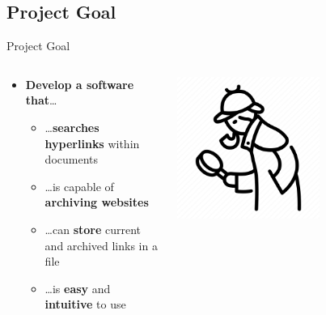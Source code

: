 \documentclass[
    ngerman,%
    authorontitle=true,
]{bfhbeamer}
\begin{document}
    \subsection{Project Goal}
    \begin{frame}{Project Goal}
        \begin{columns} %
            \begin{column}{0.5\textwidth} %
                \begin{itemize}
                    \item \textbf{Develop a software that}\ldots
                    \begin{itemize}
                        \item \ldots \textbf{searches hyperlinks} within documents
                        \item \ldots is capable of \textbf{archiving websites}
                        \item \ldots can \textbf{store} current and archived links in a file
                        \item \ldots is \textbf{easy} and \textbf{intuitive} to use
                    \end{itemize}
                \end{itemize}
            \end{column}
            \begin{column}{0.3\textwidth} %
                \begin{center}
                    \includegraphics[width=0.6\textwidth]{pictures/sherlock}
                \end{center}
            \end{column}
        \end{columns}
    \end{frame}
\end{document}
